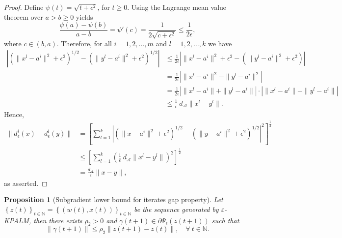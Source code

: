 \documentclass[11pt]{article}
\numberwithin{equation}{section}
\newtheorem{proposition}{Proposition}[section]
\def\abs#1{\left\lvert#1\right\rvert}
\begin{document}
\begin{proof}
Define $\psi(t)=\sqrt{t + {\epsilon}^2}$, for $t \geq 0$. Using the Lagrange mean value theorem over $a > b \geq 0$ yields
\begin{equation*}
	\frac{\psi(a) - \psi(b)}{a - b} = \psi'(c) = \frac{1}{2\sqrt{c + {\epsilon}^2}} \leq \frac{1}{2\epsilon},
\end{equation*}
where $c \in (b,a)$.
Therefore, for all $i=1,2, \ldots, m$ and $l=1,2, \ldots, k$ we have
\begin{equation*}
\begin{aligned}
	\abs{\left( \|x^l-a^i\|^2  + {\epsilon}^2 \right)^{1/2} - \left( \|y^l-a^i\|^2 + {\epsilon}^2 \right)^{1/2} } 
	&\leq \frac{1}{2\epsilon} \abs{ \|x^l-a^i\|^2 + {\epsilon}^2 - \left( \|y^l-a^i\|^2 + {\epsilon}^2 \right) } \\
	&= \frac{1}{2\epsilon} \abs{\|x^l-a^i\|^2 - \|y^l-a^i\|^2} \\
	&= \frac{1}{2\epsilon} \abs{\|x^l-a^i\| + \|y^l-a^i\|} \cdot \abs{\|x^l-a^i\| - \|y^l-a^i\|} \\
	&\leq \frac{1}{\epsilon} \: d_{\mathcal{A}}\|x^l-y^l\| .
\end{aligned}
\end{equation*}
Hence,
\begin{equation*}
\begin{aligned}
	\|d_{\epsilon}^i(x) - d_{\epsilon}^i(y)\| 
	&= \left[ \sum_{l=1}^{k} \abs{\left( \|x-a^i\|^2  + {\epsilon}^2 \right)^{1/2} - \left( \|y-a^i\|^2 + {\epsilon}^2 \right)^{1/2} }^2 \right]^\frac{1}{2} \\
	&\leq \left[ \sum_{l=1}^{k} \left( \frac{1}{\epsilon} \: d_{\mathcal{A}}\|x^l-y^l\| \right)^2 \right]^\frac{1}{2} \\
	&= \frac{ d_{\mathcal{A}}}{\epsilon}\|x-y\| ,
\end{aligned}
\end{equation*}
as asserted.
\end{proof}

\begin{proposition}[Subgradient lower bound for iterates gap property]
Let $\left\lbrace z(t) \right\rbrace_{t \in \mathbb{N}} = \left\lbrace (w(t) , x(t)) \right\rbrace_{t \in \mathbb{N}}$ be the sequence generated by $\varepsilon$-KPALM, then there exists $\rho_2 > 0$ and $\gamma(t+1) \in \partial \Psi_{\epsilon}(z(t+1))$ such that 
\begin{equation*}
	\| \gamma(t+1)\| \leq \rho_2 \|z(t+1) - z(t)\|, \quad \forall \: t \in \mathbb{N} .
\end{equation*}
\end{proposition}
\end{document}
